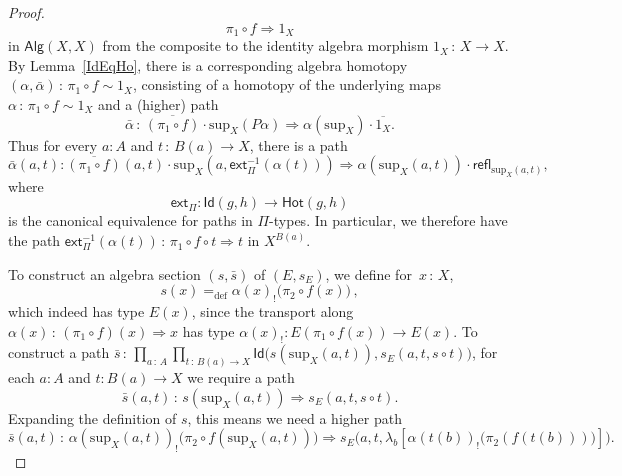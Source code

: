 \documentclass[10pt,a4paper,oneside,reqno]{amsart}
\theoremstyle{mythm}
\theoremstyle{mydef}
\theoremstyle{myrmk}
\newcommand{\defeq}{=_{\mathrm{def}}}
\newcommand{\co}{\,{:}\,}
\newcommand{\com}{\circ}
\newcommand{\ct}{\cdot}
\newcommand{\Hot}{\mathsf{Hot}}
\newcommand{\ext}{\mathsf{ext}}
\newcommand{\Id}{\mathsf{Id}}
\newcommand{\refl}{\mathsf{refl}}
\newcommand{\lam}[1]{\lambda_{#1}}
\newcommand{\Palg}{\mathsf{Alg}}
\renewcommand{\sup}{\mathrm{sup}}
\begin{document}
\begin{proof}
\begin{equation*}
\pi_1 \circ f \Rightarrow 1_X 
\end{equation*}
in $\Palg(X,X)$ from the composite to the identity algebra morphism $1_X \co X \to X$.
%
By Lemma~\ref{IdEqHo}, there is a corresponding algebra homotopy $(\alpha,\bar{\alpha}) \co \pi_1 \circ f \sim 1_X$,  consisting of a homotopy of the underlying maps $\alpha \co \pi_1 \circ f \sim 1_X$ and a (higher) path
\begin{equation*}
\bar{\alpha} \co \overline{(\pi_1 \com f)} \cdot \sup_X (P \alpha) \Rightarrow \alpha(\sup_X) \cdot \overline{1_X}.
\end{equation*}
Thus for every $a:A$ and $t\co B(a)\to X$, there is a path
\begin{equation}\label{equ:alphabar}
\bar{\alpha}(a,t) :   \overline{(\pi_1 \com f)}(a,t) \ct \sup_X(a,\ext_\Pi^{-1}(\alpha(t))) \Rightarrow \alpha(\sup_X(a,t)) \cdot \refl_{\sup_X(a,t)},
\end{equation}
where $$\ext_\Pi : \Id(g,h) \to \Hot(g, h)$$ is the canonical equivalence for paths in $\Pi$-types. 
In particular, we therefore have the path $\ext_\Pi^{-1}(\alpha(t))\co\pi_1 \circ f \circ t \Rightarrow t$ in $X^{B(a)}$.

To construct an algebra section $(s, \bar{s})$ of $(E, s_E)$, we define for~$x \co X$, 
\begin{equation}
\label{equ:defreqsection}
s(x) \defeq \alpha(x)_{!} \big( \pi_2 \com f (x) \big) \, ,
\end{equation}
which indeed has type $E(x)$, since the transport along $\alpha(x) \co (\pi_1 \circ f)(x) \Rightarrow x$ has type $\alpha(x)_{!} : E(\pi_1 \com f (x)) \to E(x)$.
%
To construct a path $\bar{s} \co \prod_{a \co A} \prod_{t \co B(a) \to X} \Id \big( s(\sup_X(a,t)), s_E(a, t, s \circ t) \big)$, for each $a:A$ and $t:B(a)\to X$ we require a path
\[
\bar{s}(a,t) \co s(\sup_X(a,t)) \Rightarrow s_E(a, t, s \circ t).
\] 
Expanding the definition of $s$, this means we need a higher path
\begin{equation}\label{eq:proof:thm:WMain:needpath}
\bar{s}(a,t) \co \alpha(\sup_X(a,t))_{!} \big( \pi_2 \com f (\sup_X(a,t)) \big) \Rightarrow s_E\big(a, t, \lam{b}[\alpha(t(b))_{!} \big( \pi_2 (f(t(b)))\big)]\big).
\end{equation}


\end{proof}
\end{document}
